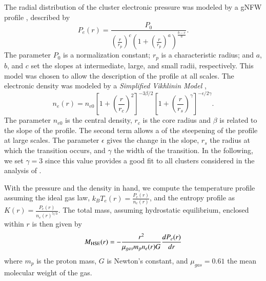 \documentclass[twocolumn,traditabstract]{aa}
\begin{document}
The radial distribution of the cluster electronic pressure was modeled by a gNFW profile \citep{nagai2007}, described by
\begin{equation}
	P_e(r) = \frac{P_0}{\left(\frac{r}{r_p}\right)^c \left(1+\left(\frac{r}{r_p}\right)^a\right)^{\frac{b-c}{a}}}.
\label{eq:gNFW}
\end{equation}
The parameter $P_0$ is a normalization constant; $r_p$ is a characteristic radius; and $a$, $b$, and $c$ set the slopes at intermediate, large, and small radii, respectively. This model was chosen to allow the description of the profile at all scales. The electronic density was modeled by a \emph{Simplified Vikhlinin Model} \citep{vikhlinin2006},
\begin{equation}
	n_e(r) = n_{e0} \left[1+\left(\frac{r}{r_c}\right)^2 \right]^{-3 \beta /2} \left[ 1+\left(\frac{r}{r_s}\right)^{\gamma} \right]^{-\epsilon/2 \gamma}.
\label{eq:SVM}
\end{equation}
The parameter $n_{e0}$ is the central density, $r_c$ is the core radius and $\beta$ is related to the slope of the profile. The second term allows a of the steepening of the profile at large scales. The parameter $\epsilon$ gives the change in the slope, $r_s$ the radius at which the transition occurs, and $\gamma$ the width of the transition. In the following, we set $\gamma = 3$ since this value provides a good fit to all clusters considered in the analysis of \cite{vikhlinin2006}.

With the pressure and the density in hand, we compute the temperature profile assuming the ideal gas law, $k_B T_e(r) = \frac{P_e(r)}{n_e(r)}$, and the entropy profile as $K(r) =  \frac{P_e(r)}{n_e(r)^{5/3}}$. The total mass, assuming hydrostatic equilibrium, enclosed within $r$ is then given by 
\begin{equation}
M_{\rm HSE}(r) = -\frac{r^2}{\mu_{gas} m_p n_e(r) G} \frac{dP_e(r)}{dr}
\end{equation}
where $m_p$ is the proton mass, $G$ is Newton’s constant, and $\mu_{gas} = 0.61$ the mean molecular weight of the gas.
\end{document}
